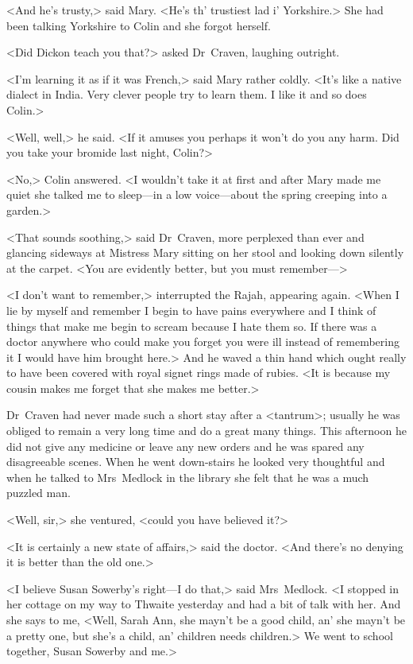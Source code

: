 <And he's trusty,> said Mary. <He's th' trustiest lad i' Yorkshire.> She had been talking Yorkshire to Colin and she forgot herself.

<Did Dickon teach you that?> asked Dr~Craven, laughing outright.

<I'm learning it as if it was French,> said Mary rather coldly. <It's like a native dialect in India. Very clever people try to learn them. I like it and so does Colin.>

<Well, well,> he said. <If it amuses you perhaps it won't do you any harm. Did you take your bromide last night, Colin?>

<No,> Colin answered. <I wouldn't take it at first and after Mary made me quiet she talked me to sleep—in a low voice—about the spring creeping into a garden.>

<That sounds soothing,> said Dr~Craven, more perplexed than ever and glancing sideways at Mistress Mary sitting on her stool and looking down silently at the carpet. <You are evidently better, but you must remember—>

<I don't want to remember,> interrupted the Rajah, appearing again. <When I lie by myself and remember I begin to have pains everywhere and I think of things that make me begin to scream because I hate them so. If there was a doctor anywhere who could make you forget you were ill instead of remembering it I would have him brought here.> And he waved a thin hand which ought really to have been covered with royal signet rings made of rubies. <It is because my cousin makes me forget that she makes me better.>

Dr~Craven had never made such a short stay after a <tantrum>; usually he was obliged to remain a very long time and do a great many things. This afternoon he did not give any medicine or leave any new orders and he was spared any disagreeable scenes. When he went down-stairs he looked very thoughtful and when he talked to Mrs~Medlock in the library she felt that he was a much puzzled man.

<Well, sir,> she ventured, <could you have believed it?>

<It is certainly a new state of affairs,> said the doctor. <And there's no denying it is better than the old one.>

<I believe Susan Sowerby's right—I do that,> said Mrs~Medlock. <I stopped in her cottage on my way to Thwaite yesterday and had a bit of talk with her. And she says to me, <Well, Sarah Ann, she mayn't be a good child, an' she mayn't be a pretty one, but she's a child, an' children needs children.> We went to school together, Susan Sowerby and me.>

